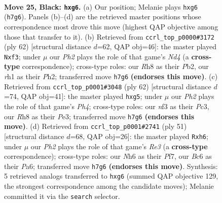\documentclass[11pt]{article}
\begin{document}
\clearpage

\begin{figure}[p]\centering
\begin{subfigure}{0.46\textwidth}\centering
\resizebox{\linewidth}{!}{%
\newchessgame
\chessboard[
  setfen={4k2r/5p1p/P1b3Pn/4P3/8/5NK1/1r4P1/RN5R b k - 0 25},
  showmover=false,
  pgfstyle=straightmove, color=movearrow, markmove={h7-g6}
]}
\caption{}
\end{subfigure}\hfill
\begin{subfigure}{0.46\textwidth}\centering
\resizebox{\linewidth}{!}{%
\newchessgame
\chessboard[
  setfen={4r1k1/1pR4p/p7/3Rn3/1r1NPp2/5p2/1P4PP/6K1 w - - 2 32},
  showmover=false,
  pgfstyle=straightmove, color=movearrow, markmove={d4-f3}
]}
\caption{}
\end{subfigure}
\\[4pt]
\begin{subfigure}{0.46\textwidth}\centering
\resizebox{\linewidth}{!}{%
\newchessgame
\chessboard[
  setfen={4k3/4p3/p5pp/n1r3p1/R6P/2P1PN2/5P2/5K2 w - - 0 32},
  showmover=false,
  pgfstyle=straightmove, color=movearrow, markmove={h4-g5}
]}
\caption{}
\end{subfigure}\hfill
\begin{subfigure}{0.46\textwidth}\centering
\resizebox{\linewidth}{!}{%
\newchessgame
\chessboard[
  setfen={2r3k1/5pp1/p3r2P/1p6/3RN3/P4PP1/1n2P3/5RK1 b - - 0 26},
  showmover=false,
  pgfstyle=straightmove, color=movearrow, markmove={e6-h6}
]}
\caption{}
\end{subfigure}
\caption{\textbf{Move 25, Black: \texttt{hxg6}.} (a) Our position; Melanie plays \texttt{hxg6} (\texttt{h7g6}). Panels (b)--(d) are the retrieved master positions whose correspondence most drove this move (highest QAP objective among those that transfer to it). (b) Retrieved from \texttt{ccrl\_top\_p0000\#3172} (ply 62) [structural distance $d$=62, QAP obj=46]: the master played \texttt{Nxf3}; under $\mu$ our \emph{Ph2} plays the role of that game's \emph{Nd4} (a \textbf{cross-type} correspondence); cross-type roles: our \emph{R}h8 as their \emph{P}b2, our \emph{r}h1 as their \emph{P}h2; transferred move \texttt{h7g6} \textbf{(endorses this move)}. (c) Retrieved from \texttt{ccrl\_top\_p0001\#3048} (ply 62) [structural distance $d$=74, QAP obj=41]: the master played \texttt{hxg5}; under $\mu$ our \emph{Ph2} plays the role of that game's \emph{Ph4}; cross-type roles: our \emph{n}f3 as their \emph{P}c3, our \emph{R}h8 as their \emph{P}e3; transferred move \texttt{h7g6} \textbf{(endorses this move)}. (d) Retrieved from \texttt{ccrl\_top\_p0001\#2741} (ply 51) [structural distance $d$=68, QAP obj=26]: the master played \texttt{Rxh6}; under $\mu$ our \emph{Ph2} plays the role of that game's \emph{Re3} (a \textbf{cross-type} correspondence); cross-type roles: our \emph{N}h6 as their \emph{P}f7, our \emph{B}c6 as their \emph{P}a6; transferred move \texttt{h7g6} \textbf{(endorses this move)}. Synthesis: 5 retrieved analogs transferred to \texttt{hxg6} (summed QAP objective 129, the strongest correspondence among the candidate moves); Melanie committed it via the \texttt{search} selector.}
\label{fig:thought-m49}
\end{figure}
\end{document}
